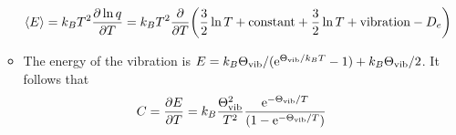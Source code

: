 \documentclass[../notes.tex]{subfiles}
\begin{document}
\begin{itemize}
\begin{itemize}
        \begin{equation*}
            \prb{E} = k_BT^2\pdv{\ln q}{T}
            = k_BT^2\pdv{T}(\frac{3}{2}\ln T+\text{constant}+\frac{3}{2}\ln T+\text{vibration}-D_e)
        \end{equation*}
        \item The energy of the vibration is $E=k_B\Theta_\text{vib}/(\e[\Theta_\text{vib}/k_BT]-1)+k_B\Theta_\text{vib}/2$. It follows that
        \begin{equation*}
            C = \pdv{E}{T}
            = k_B\frac{\Theta_\text{vib}^2}{T^2}\frac{\e[-\Theta_\text{vib}/T]}{(1-\e[-\Theta_\text{vib}/T])}
        \end{equation*}
    \end{itemize}
\end{itemize}
\end{document}
